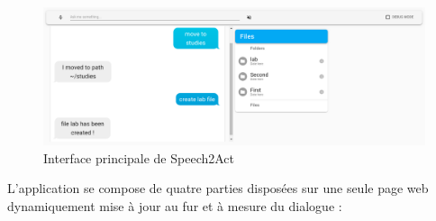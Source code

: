\begin{figure}[H]
	\centering
	\includegraphics[width=\linewidth]{images/implementation/app_screens/main.png} 
	\caption{Interface principale de Speech2Act}
\end{figure} 

\par 
L'application se compose de quatre parties disposées sur une seule page web dynamiquement mise à jour au fur et à mesure du dialogue :

